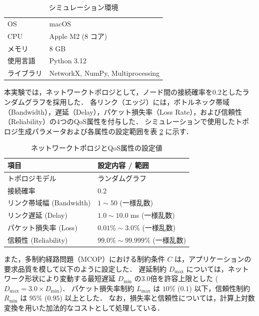 \begin{table}[tb]
  \centering
  \caption{シミュレーション環境}
  \label{tab:env}
  \begin{tabular}{l|l} \hline
    OS & macOS \\
    CPU & Apple M2 (8 コア) \\
    メモリ & 8 GB \\
    使用言語 & Python 3.12 \\
    ライブラリ & NetworkX, NumPy, Multiprocessing \\ \hline
  \end{tabular}
\end{table}

本実験では，ネットワークトポロジとして，ノード間の接続確率を0.2としたランダムグラフを採用した．
各リンク（エッジ）には，ボトルネック帯域（Bandwidth），遅延（Delay），パケット損失率（Loss Rate），および信頼性（Reliability）の4つのQoS属性を付与した．
シミュレーションで使用したトポロジ生成パラメータおよび各属性の設定範囲を表 \ref{tab:topology_params} に示す．

\begin{table}[tb]
  \centering
  \caption{ネットワークトポロジとQoS属性の設定値}
  \label{tab:topology_params}
  \begin{tabular}{l|l} \hline
    項目 & 設定内容 / 範囲 \\ \hline
    トポロジモデル & ランダムグラフ \\
    接続確率 & 0.2 \\
    リンク帯域幅 (Bandwidth) & $1 \sim 50$ (一様乱数) \\
    リンク遅延 (Delay) & $1.0 \sim 10.0$ ms (一様乱数) \\
    パケット損失率 (Loss) & $0.01\% \sim 3.0\%$ (一様乱数) \\
    信頼性 (Reliability) & $99.0\% \sim 99.999\%$ (一様乱数) \\ \hline
  \end{tabular}
\end{table}

また，多制約経路問題（MCOP）における制約条件 $C$ は，アプリケーションの要求品質を模して以下のように設定した．
遅延制約 $D_{\max}$ については，ネットワーク形状により変動する最短遅延 $D_{\min}$ の3.0倍を許容上限とした ($D_{\max} = 3.0 \times D_{\min}$)．
パケット損失率制約 $L_{\max}$ は $10\%$ ($0.1$) 以下，信頼性制約 $R_{\min}$ は $95\%$ ($0.95$) 以上とした．
なお，損失率と信頼性については，計算上対数変換を用いた加法的なコストとして処理している．

